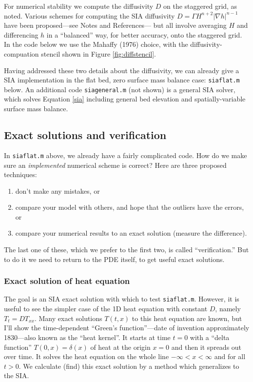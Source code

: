 \documentclass[titlepage,letterpaper,final,12pt]{scrartcl}
\newcommand{\grad}{\nabla}
\newcommand{\minput}[1]{
\bigskip
\begin{quote}
\bigskip
\VerbatimInput[frame=single,framesep=3mm,label=\fbox{\normalsize \textsl{\,#1.m\,}},fontfamily=courier,fontsize=\scriptsize]{../mfiles/#1.slim.m}
\bigskip
\end{quote}
}
\begin{document}
For numerical stability we compute the diffusivity $D$ on the staggered grid, as noted.  Various schemes for computing the SIA diffusivity $D = \Gamma H^{n+2} |\grad h|^{n-1}$ have been proposed---see Notes and References---
but all involve averaging $H$ and differencing $h$ in a ``balanced'' way, for better accuracy, onto the staggered grid.  In the code below we use the Mahaffy (1976) choice, with the diffusivity-compuation stencil shown in Figure \ref{fig:diffstencil}.

Having addressed these two details about the diffusivity, we can already give a SIA implementation in the flat bed, zero surface mass balance case: \texttt{siaflat.m} below.  An additional code \texttt{siageneral.m} (not shown) is a general SIA solver, which solves Equation \eqref{sia} including general bed elevation and spatially-variable surface mass balance.

\minput{siaflat}


\subsection{Exact solutions and verification}

In \texttt{siaflat.m} above, we already have a fairly complicated code.  How do we make sure an \emph{implemented} numerical scheme is correct?  Here are three proposed techniques:
\begin{enumerate}
  \item don't make any mistakes, or
  \item compare your model with others, and hope that the outliers have the errors, or
  \item compare your numerical results to an exact solution (measure the difference).   \end{enumerate}
The last one of these, which we prefer to the first two, is called ``verification.''  %
But to do it we need to return to the PDE itself, to get useful exact solutions.

\subsubsection*{Exact solution of heat equation}

The goal is an SIA exact solution with which to test \texttt{siaflat.m}.  However, it is useful to see the simpler case of the 1D heat equation with constant $D$, namely $T_t = D T_{xx}$.  Many exact solutions $T(t,x)$ to this heat equation are known, but I'll show the time-dependent ``Green's function''---date of invention approximately 1830---also known as the ``heat kernel''.  It starts at time $t=0$ with a ``delta function'' $T(0,x)=\delta(x)$ of heat at the origin $x=0$ and then it spreads out over time.  It solves the heat equation on the whole line $-\infty<x<\infty$ and for all $t>0$.  We calculate (find) this exact solution by a method which generalizes to the SIA.
\end{document}
